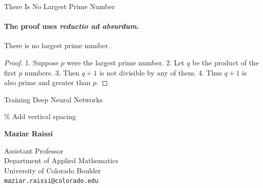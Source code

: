 \documentclass[
  ignorenonframetext,
  aspectratio=32,
]{beamer}
\begin{document}
\begin{frame}{There Is No Largest Prime Number}
\label{there-is-no-largest-prime-number-1}
\framesubtitle{The proof uses \textit{reductio ad absurdum}.}
\begin{theorem}
There is no largest prime number.
\end{theorem}
\begin{proof}

1. Suppose $p$ were the largest prime number.
2. Let $q$ be the product of the first $p$ numbers.
3. Then $q+1$ is not divisible by any of them.
4. Thus $q+1$ is also prime and greater than $p$.\qedhere

\end{proof}
\end{frame}

\begin{frame}{Training Deep Neural Networks}
\label{training-deep-neural-networks}

\vspace{10pt}

\% Add vertical spacing

\begin{flushleft}
    \textbf{Maziar Raissi}

    Assistant Professor \\
    Department of Applied Mathematics \\
    University of Colorado Boulder \\
    \texttt{maziar.raissi@colorado.edu}
\end{flushleft}
\end{frame}
\end{document}
